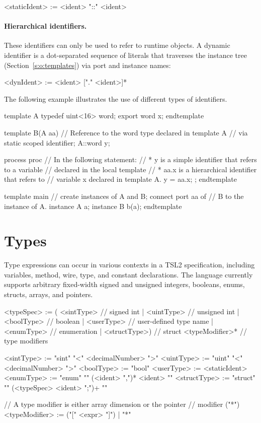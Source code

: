 \documentclass{report}
\newcommand{\tsl}{TSL2 }
\begin{document}
\begin{bnflisting}{}
<staticIdent> := <ident> "::" <ident>
\end{bnflisting}

\paragraph{Hierarchical identifiers.}  These identifiers can only 
be used to refer to runtime objects.  A dynamic identifier is a 
dot-separated sequence of literals that traverses the instance 
tree (Section~\ref{s:o:templates}) via port and instance names:

\begin{bnflisting}{}
<dynIdent> := <ident> ["." <ident>]*
\end{bnflisting}

The following example illustrates the use of different types of 
identifiers.

\begin{tsllisting}{}
template A
  typedef uint<16> word;
  export word x;
endtemplate
    
template B(A aa)
  // Reference to the word type declared in template A
  // via static scoped identifier;
  A::word y;

  process proc {
    // In the following statement:
    // * y is a simple identifier that refers to a variable
    //   declared in the local template
    // * aa.x is a hierarchical identifier that refers to
    //   variable x declared in template A.
    y = aa.x;
  };
endtemplate

template main
  // create instances of A and B; connect port aa of
  // B to the instance of A.
  instance A a;
  instance B b(a);
endtemplate
\end{tsllisting}


\section{Types}

Type expressions can occur in various contexts in a \tsl 
specification, including variables, method, wire, type, and 
constant declarations.  The language currently supports arbitrary 
fixed-width signed and unsigned integers, booleans, enums, 
structs, arrays, and pointers.

\begin{bnflisting}{}
<typeSpec>   := ( <sintType>    // signed int
                | <uintType>    // unsigned int
                | <boolType>    // boolean
                | <userType>    // user-defined type name
                | <enumType>    // enumeration
                | <structType>) // struct
                <typeModifier>* // type modifiers

<sintType>   := "sint" "<" <decimalNumber> ">"
<uintType>   := "uint" "<" <decimalNumber> ">"
<boolType>   := "bool"
<userType>   := <staticIdent>
<enumType>   := "enum" "{" (<ident> ",")*  <ident> "}"
<structType> := "struct" "{" (<typeSpec> <ident> ";")+ "}"

// A type modifier is either array dimension or the pointer
// modifier ("*")
<typeModifier> := ("[" <expr> "]")
                | "*"
\end{bnflisting}
\end{document}

